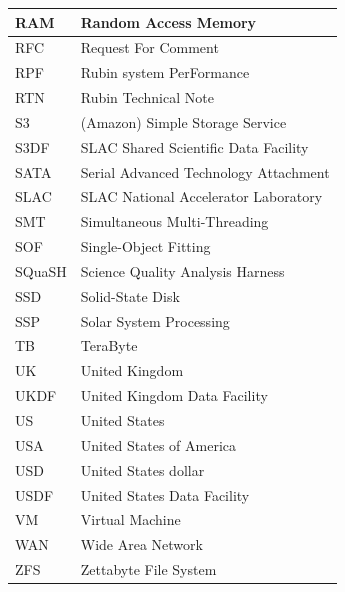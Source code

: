 \begin{longtable}{p{}p{}}
RAM & Random Access Memory \\\hline
RFC & Request For Comment \\\hline
RPF & Rubin system PerFormance \\\hline
RTN & Rubin Technical Note \\\hline
S3 & (Amazon) Simple Storage Service \\\hline
S3DF & SLAC Shared Scientific Data Facility \\\hline
SATA & Serial Advanced Technology Attachment \\\hline
SLAC & SLAC National Accelerator Laboratory \\\hline
SMT & Simultaneous Multi-Threading \\\hline
SOF & Single-Object Fitting \\\hline
SQuaSH & Science Quality Analysis Harness \\\hline
SSD & Solid-State Disk \\\hline
SSP & Solar System Processing \\\hline
TB & TeraByte \\\hline
UK & United Kingdom \\\hline
UKDF & United Kingdom Data Facility \\\hline
US & United States \\\hline
USA & United States of America \\\hline
USD & United States dollar \\\hline
USDF & United States Data Facility \\\hline
VM & Virtual Machine \\\hline
WAN & Wide Area Network \\\hline
ZFS & Zettabyte File System \\\hline
\end{longtable}
